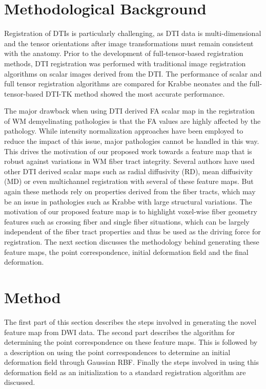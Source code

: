 \documentclass{llncs}
\begin{document}
\section{Methodological Background}
\label{sec:methodBackground}
Registration of DTIs is particularly challenging, as DTI data is multi-dimensional and the tensor orientations after image transformations must remain consistent with the anatomy. Prior to the development of full-tensor-based registration methods, DTI registration was performed with traditional image registration algorithms on scalar images derived from the DTI. The performance of scalar and full tensor registration algorithms are compared for Krabbe neonates \cite{Wang11} and the full-tensor-based DTI-TK \cite{Zhang06} method showed the most accurate performance.

The major drawback when using DTI derived FA scalar map in the registration of WM demyelinating pathologies is that the FA values are highly affected by the pathology. While intensity normalization approaches have been employed to reduce the impact of this issue, major pathologies cannot be handled in this way. This drives the motivation of our proposed work towards a feature map that is robust against variations in WM fiber tract integrity. Several authors have used other DTI derived scalar maps such as radial diffusivity (RD), mean diffusivity (MD) or even multichannel registration \cite{Alexand99} with several of these feature maps. But again these methods rely on properties derived from the fiber tracts, which may be an issue in pathologies such as Krabbe with large structural variations. The motivation of our proposed feature map is to highlight voxel-wise fiber geometry features such as crossing fiber and single fiber situations, which can be largely independent of the fiber tract properties and thus be used  as the driving force for registration. The next section discusses the methodology behind generating these feature maps, the point correspondence, initial deformation field and the final deformation.


\section{Method}
\label{sec:method}
The first part of this section describes the steps involved in generating the novel feature map from DWI data. The second part describes the algorithm for determining the point correspondence on these feature maps. This is followed by a description on using the point correspondences to determine an initial deformation field through Gaussian RBF. Finally the steps involved in using this deformation field as an initialization to a standard registration algorithm are discussed.
\end{document}
